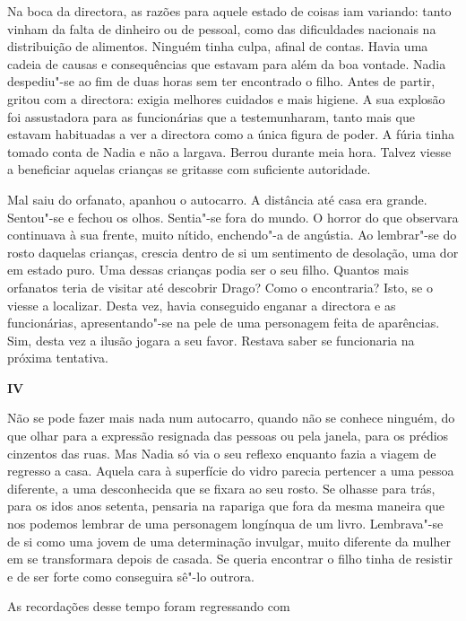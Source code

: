 Na boca da directora, as razões para aquele estado de
coisas iam variando: tanto vinham da falta de dinheiro ou
de pessoal, como das dificuldades nacionais na distribuição de
alimentos. Ninguém tinha culpa, afinal de contas. Havia uma cadeia de
causas e consequências que estavam para além da boa vontade. Nadia
despediu"-se ao fim de duas horas sem ter encontrado o filho. Antes de
partir, gritou com a directora: exigia melhores cuidados e mais higiene.
A sua explosão foi assustadora para as funcionárias que a
testemunharam, tanto mais que estavam habituadas a ver a directora
como a única figura de poder. A fúria tinha tomado conta de Nadia e não
a largava. Berrou durante meia hora. Talvez viesse a beneficiar aquelas crianças se gritasse com suficiente autoridade.

Mal saiu do orfanato, apanhou o autocarro. A distância até casa era
grande. Sentou"-se e fechou os olhos. Sentia"-se fora do mundo. O horror
do que observara continuava à sua frente, muito nítido, enchendo"-a de
angústia. Ao lembrar"-se do rosto daquelas crianças, crescia dentro de si
um sentimento de desolação, uma dor em estado puro. Uma dessas crianças
podia ser o seu filho. Quantos mais orfanatos teria de visitar até
descobrir Drago? Como o encontraria? Isto, se o viesse a localizar.
Desta vez, havia conseguido enganar a directora e as funcionárias,
apresentando"-se na pele de uma personagem feita de aparências. Sim,
desta vez a ilusão jogara a seu favor. Restava saber se funcionaria na
próxima tentativa.

\pagebreak
\vspace*{1.8cm}
\noindent{}\textbf{IV}

\bigskip

Não se pode fazer mais nada num autocarro, quando não se conhece
ninguém, do que olhar para a expressão resignada das pessoas ou pela
janela, para os prédios cinzentos das ruas. Mas Nadia só via o seu
reflexo enquanto fazia a viagem de regresso a casa. Aquela cara à
superfície do vidro parecia pertencer a uma pessoa diferente, a uma
desconhecida que se fixara ao seu rosto. Se olhasse para trás, para os
idos anos setenta, pensaria na rapariga que fora da mesma maneira que
nos podemos lembrar de uma personagem longínqua de um livro. Lembrava"-se
de si como uma jovem de uma determinação invulgar, muito diferente da
mulher em se transformara depois de casada. Se queria encontrar o filho
tinha de resistir e de ser forte como conseguira sê"-lo outrora.

As recordações desse tempo foram regressando com

